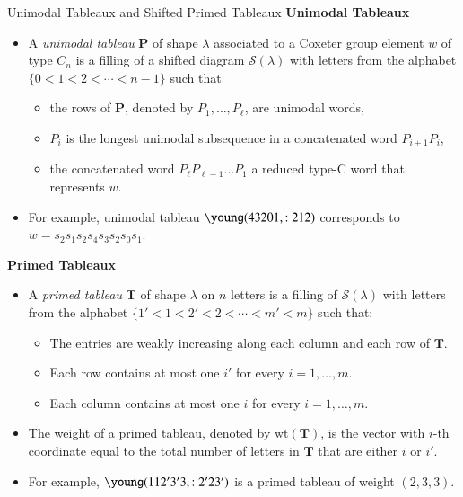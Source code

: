 \documentclass[final]{beamer}
\theoremstyle{definition}
\numberwithin{equation}{section}
\newcommand{\twop}{2'}
\newcommand{\threep}{3'}
\newcommand{\wt}{\mathrm{wt}}
\newlength{\onecolwid}
\newlength{\twocolwid}
\begin{document}
\begin{frame}[t]
\begin{columns}[t]
\begin{column}{\twocolwid}
\begin{columns}[t]
\begin{column}{\onecolwid}
\begin{block}{Unimodal Tableaux and Shifted Primed Tableaux}
\textbf{Unimodal Tableaux}
\begin{itemize}

\item A \textit{unimodal tableau} $\mathbf{P}$ of shape $\lambda$ associated to a Coxeter group element $w$ of type $C_n$ is a filling of a shifted diagram $\mathcal{S}(\lambda)$ with letters from the alphabet $\{0< 1 < 2< \cdots < n-1\}$ such that
	\begin{itemize}
	\item the rows of $\mathbf{P}$, denoted by $P_1, \ldots, P_\ell$, are unimodal words,
	\item $P_i$ is the longest unimodal subsequence in a concatenated word $P_{i+1}P_i$,
	\item the concatenated word $P_\ell P_{\ell-1} \ldots P_1$ a reduced type-C word that represents $w$.
	\end{itemize}
\item For example, unimodal tableau $\young(43201,:212)$ corresponds to $w=s_2 s_1 s_2 s_4 s_3 s_2 s_0 s_1$.
\end{itemize}

\textbf{Primed Tableaux}
\begin{itemize}
\item A \textit{primed tableau} $\mathbf{T}$ of shape $\lambda$ on $n$ letters is a filling of $\mathcal{S}(\lambda)$ 
with letters from the alphabet $\{1' < 1 < 2'< 2< \cdots <m' < m\}$ such that:
	\begin{itemize}
	\item The entries are weakly increasing along each column and each row of $\mathbf{T}$.
	\item Each row contains at most one $i'$ for every $i = 1,\ldots,m$.
	\item Each column contains at most one $i$ for every $i = 1,\ldots,m$.
	\end{itemize}
\item The weight of a primed tableau, denoted by $\wt(\mathbf{T})$, is the vector with $i$-th coordinate equal to the total number of letters in $\mathbf{T}$ that are either $i$ or $i'$.
\item For example, $\young(11\twop\threep3,:\twop2\threep)$ is a primed tableau of weight $(2,3,3)$.
\end{itemize}

\end{block}



\end{column}
\end{columns}
\end{column}
\end{columns}
\end{frame}
\end{document}
